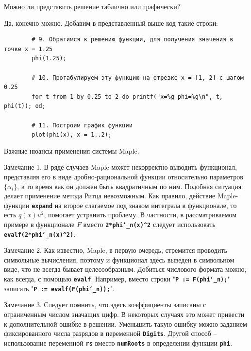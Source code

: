 \documentclass{article}
\begin{document}
\newpage
\begin{question}
	Можно ли представить решение таблично или графически?
\end{question}

Да, конечно можно. Добавим в представленный выше код такие строки:

\begin{commandline}
	\begin{verbatim}
		# 9. Обратимся к решению функции, для получения значения в точке x = 1.25
		phi(1.25);
		
		# 10. Протабулируем эту функцию на отрезке x = [1, 2] с шагом 0.25
		for t from 1 by 0.25 to 2 do printf("x=%g phi=%g\n", t, phi(t)); od;
		
		# 11. Построим график функции
		plot(phi(x), x = 1..2);
	\end{verbatim}
\end{commandline}

\begin{warn}[ВНИМАНИЕ!]
	Важные нюансы применения системы Maple.
	
	Замечание 1. В ряде случаев Maple может некорректно выводить функционал, представляя его в виде дробно-рациональной функции относительно параметров $\{\alpha_{i}\}$, в то время как он должен быть квадратичным по ним. Подобная ситуация делает применение метода Ритца невозможным. Как правило, действие Maple-функции \textbf{\texttt{expand}} на второе слагаемое под знаком интеграла в функционале, то есть $q(x)u^{2}$, помогает устранить проблему. В частности, в рассматриваемом примере в функционале $F$ вместо \textbf{\texttt{2*phi\char`_n(x)\^{}2}} следует использовать \textbf{\texttt{evalf(2*phi\char`_n(x)\^{}2)}}.
	
	Замечание 2. Как известно, Maple, в первую очередь, стремится проводить символьные вычисления, поэтому и функционал здесь выведен в символьном виде, что не всегда бывает целесообразным. Добиться числового формата можно, как всегда, с помощью \textbf{\texttt{evalf}}. Например, вместо строки "\textbf{\texttt{P := F(phi\char`_n);}}" \; записать \; "\textbf{\texttt{P := evalf(F(phi\char`_n));}}".
	
	Замечание 3. Следует помнить, что здесь коэффициенты записаны с ограниченным числом значащих цифр. В некоторых случаях это может привести к дополнительной ошибке в решении. Уменьшить такую ошибку можно заданием фиксированного числа разрядов в переменной \textbf{\texttt{Digits}}. Другой способ – использование переменной \textbf{\texttt{rs}} вместо \textbf{\texttt{numRoots}} в определении функции \textbf{\texttt{phi}}.
\end{warn}
\end{document}
